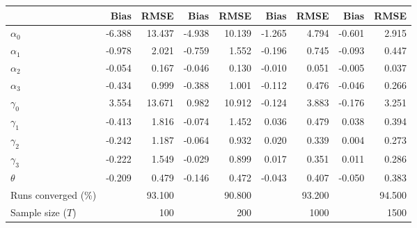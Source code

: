 
\begin{tabular}[t]{lrrrrrrrr}
\toprule
  & Bias & RMSE & Bias & RMSE & Bias & RMSE & Bias & RMSE\\
\midrule
$\alpha_{0}$ & -6.388 & 13.437 & -4.938 & 10.139 & -1.265 & 4.794 & -0.601 & 2.915\\
$\alpha_{1}$ & -0.978 & 2.021 & -0.759 & 1.552 & -0.196 & 0.745 & -0.093 & 0.447\\
$\alpha_{2}$ & -0.054 & 0.167 & -0.046 & 0.130 & -0.010 & 0.051 & -0.005 & 0.037\\
$\alpha_{3}$ & -0.434 & 0.999 & -0.388 & 1.001 & -0.112 & 0.476 & -0.046 & 0.266\\
$\gamma_{0}$ & 3.554 & 13.671 & 0.982 & 10.912 & -0.124 & 3.883 & -0.176 & 3.251\\
$\gamma_{1}$ & -0.413 & 1.816 & -0.074 & 1.452 & 0.036 & 0.479 & 0.038 & 0.394\\
$\gamma_{2}$ & -0.242 & 1.187 & -0.064 & 0.932 & 0.020 & 0.339 & 0.004 & 0.273\\
$\gamma_{3}$ & -0.222 & 1.549 & -0.029 & 0.899 & 0.017 & 0.351 & 0.011 & 0.286\\
$\theta$ & -0.209 & 0.479 & -0.146 & 0.472 & -0.043 & 0.407 & -0.050 & 0.383\\
Runs converged (\%) &  & 93.100 &  & 90.800 &  & 93.200 &  & 94.500\\
Sample size ($T$) &  & 100 &  & 200 &  & 1000 &  & 1500\\
\bottomrule
\end{tabular}
